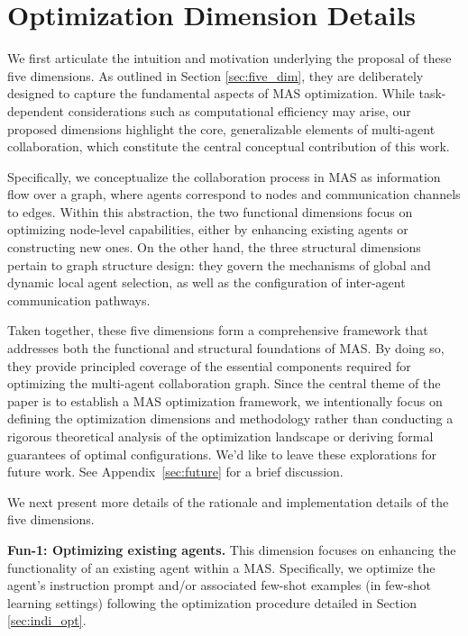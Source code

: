

\section{Optimization Dimension Details}\label{sec:dim_detail}



We first articulate the intuition and motivation underlying the proposal of these five dimensions. As outlined in Section \ref{sec:five_dim}, they are deliberately designed to capture the fundamental aspects of MAS optimization. While task-dependent considerations such as computational efficiency may arise, our proposed dimensions highlight the core, generalizable elements of multi-agent collaboration, which constitute the central conceptual contribution of this work.

Specifically, we conceptualize the collaboration process in MAS as information flow over a graph, where agents correspond to nodes and communication channels to edges. Within this abstraction, the two functional dimensions focus on optimizing node-level capabilities, either by enhancing existing agents or constructing new ones. On the other hand, the three structural dimensions pertain to graph structure design: they govern the mechanisms of global and dynamic local agent selection, as well as the configuration of inter-agent communication pathways.

Taken together, these five dimensions form a comprehensive framework that addresses both the functional and structural foundations of MAS. By doing so, they provide principled coverage of the essential components required for optimizing the multi-agent collaboration graph. Since the central theme of the paper is to establish a MAS optimization framework, we intentionally focus on defining the optimization dimensions and methodology rather than conducting a rigorous theoretical analysis of the optimization landscape or deriving formal guarantees of optimal configurations. We'd like to leave these explorations for future work. See Appendix~\ref{sec:future} for a brief discussion.



We next present more details of the rationale and implementation details of the five dimensions.


\noindent \textbf{Fun-1: Optimizing existing agents.} This dimension focuses on enhancing the functionality of an existing agent within a MAS. Specifically, we optimize the agent's instruction prompt and/or associated few-shot examples (in few-shot learning settings) following the optimization procedure detailed in Section \ref{sec:indi_opt}. 

